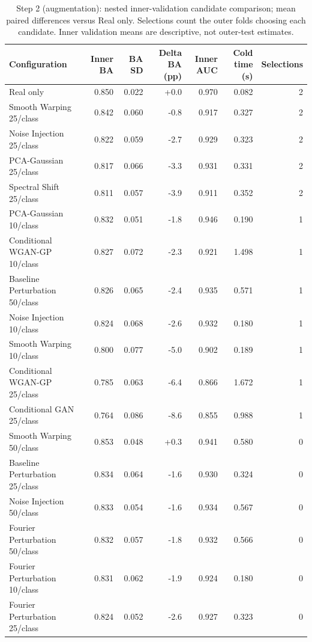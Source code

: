 \begin{table}[t]
\centering
\caption{Step 2 (augmentation): nested inner-validation candidate comparison; mean paired differences versus Real only. Selections count the outer folds choosing each candidate. Inner validation means are descriptive, not outer-test estimates.}
\label{tab:step2_candidates}
\footnotesize
\setlength{\tabcolsep}{4pt}
\begin{tabular}{lrrrrrr}
\toprule
Configuration & Inner BA & BA SD & Delta BA (pp) & Inner AUC & Cold time (s) & Selections \\
\midrule
Real only & 0.850 & 0.022 & +0.0 & 0.970 & 0.082 & 2 \\
Smooth Warping 25/class & 0.842 & 0.060 & -0.8 & 0.917 & 0.327 & 2 \\
Noise Injection 25/class & 0.822 & 0.059 & -2.7 & 0.929 & 0.323 & 2 \\
PCA-Gaussian 25/class & 0.817 & 0.066 & -3.3 & 0.931 & 0.331 & 2 \\
Spectral Shift 25/class & 0.811 & 0.057 & -3.9 & 0.911 & 0.352 & 2 \\
PCA-Gaussian 10/class & 0.832 & 0.051 & -1.8 & 0.946 & 0.190 & 1 \\
Conditional WGAN-GP 10/class & 0.827 & 0.072 & -2.3 & 0.921 & 1.498 & 1 \\
Baseline Perturbation 50/class & 0.826 & 0.065 & -2.4 & 0.935 & 0.571 & 1 \\
Noise Injection 10/class & 0.824 & 0.068 & -2.6 & 0.932 & 0.180 & 1 \\
Smooth Warping 10/class & 0.800 & 0.077 & -5.0 & 0.902 & 0.189 & 1 \\
Conditional WGAN-GP 25/class & 0.785 & 0.063 & -6.4 & 0.866 & 1.672 & 1 \\
Conditional GAN 25/class & 0.764 & 0.086 & -8.6 & 0.855 & 0.988 & 1 \\
Smooth Warping 50/class & 0.853 & 0.048 & +0.3 & 0.941 & 0.580 & 0 \\
Baseline Perturbation 25/class & 0.834 & 0.064 & -1.6 & 0.930 & 0.324 & 0 \\
Noise Injection 50/class & 0.833 & 0.054 & -1.6 & 0.934 & 0.567 & 0 \\
Fourier Perturbation 50/class & 0.832 & 0.057 & -1.8 & 0.932 & 0.566 & 0 \\
Fourier Perturbation 10/class & 0.831 & 0.062 & -1.9 & 0.924 & 0.180 & 0 \\
Fourier Perturbation 25/class & 0.824 & 0.052 & -2.6 & 0.927 & 0.323 & 0 \\

\end{tabular}
\end{table}
